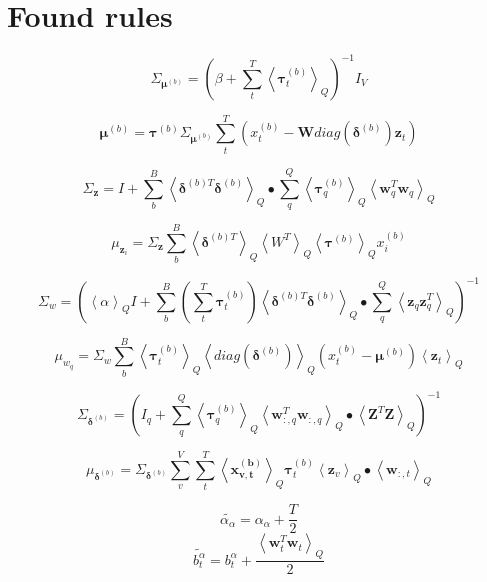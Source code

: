 \documentclass[10pt]{article}
\newcommand{\Angle}[1]{\left \langle #1 \right \rangle}
\newcommand{\Eq}[1]{\Angle{#1}_Q}
\begin{document}
\section{Found rules}


    \begin{equation}
        \Sigma_{\bm{\mu}^{(b)}} = (\beta + \sum_t^T\Eq{\bm{\tau}_t^{(b)}})^{-1}I_V
    \end{equation}

    \begin{equation}
        \bm{\mu}^{(b)} = \bm{\tau}^{(b)}\Sigma_{\bm{\mu}^{(b)}} \sum_t^T(x_t^{(b)} - \bm{W}diag(\bm{\delta}^{(b)})\bm{z}_t)
    \end{equation}


    \begin{equation}
        \Sigma_{\bm{z}} = I + \sum_b^B
        \Eq{\bm{\delta}^{(b)T}\bm{\delta}^{(b)}}\bullet\sum_q^Q\Eq{\bm{\tau}_q^{(b)}}\Eq{\bm{w}_q^T\bm{w}_q}
    \end{equation}

    \begin{equation}
        \mu_{\bm{z}_i} = \Sigma_{\bm{z}}\sum_b^B\Eq{\bm{\delta}^{(b)T}}\Eq{W^T}\Eq{\bm{\tau}^{(b)}}x^{(b)}_i
    \end{equation}

    \begin{equation}
        \Sigma_{w} = (\Eq{\alpha}I + \sum_b^B(\sum_t^T\bm{\tau}_t^{(b)})\Eq{\bm{\delta}^{(b)T}\bm{\delta}^{(b)}}\bullet\sum_q^Q\Eq{\bm{z}_q\bm{z}_q^T})^{-1}
    \end{equation}

    \begin{equation}
        \mu_{w_q} = \Sigma_{w}\sum_b^B\Eq{\bm{\tau}_t^{(b)}}\Eq{diag(\bm{\delta}^{(b)})}(x_t^{(b)} - \bm{\mu}^{(b)})\Eq{\bm{z}_t}
    \end{equation}

    \begin{equation}
        \Sigma_{\bm{\delta}^{(b)}} = (I_q + \sum_q^Q\Eq{\bm{\tau}_q^{(b)}}\Eq{\bm{w}_{:,q}^T\bm{w}_{:,q}}\bullet\Eq{\bm{Z}^T\bm{Z}})^{-1}
    \end{equation}

    \begin{equation}
        \mu_{\bm{\delta}^{(b)}}=\Sigma_{\bm{\delta}^{(b)}}\sum_v^V\sum_t^T\Eq{\bm{x_{v,t}^{(b)}}}\bm{\tau}^{(b)}_t\Eq{\bm{z}_v}\bullet\Eq{\bm{w}_{:,t}}
    \end{equation}

    \begin{equation}
        \tilde{\alpha_{\alpha}} = \alpha_{\alpha} + \frac{T}{2}
    \end{equation}
    \begin{equation}
        \tilde{b^{\alpha}_t} = b^{\alpha}_t + \frac{\Eq{\bm{w}_t^T\bm{w}_t}}{2}
    \end{equation}
\end{document}
